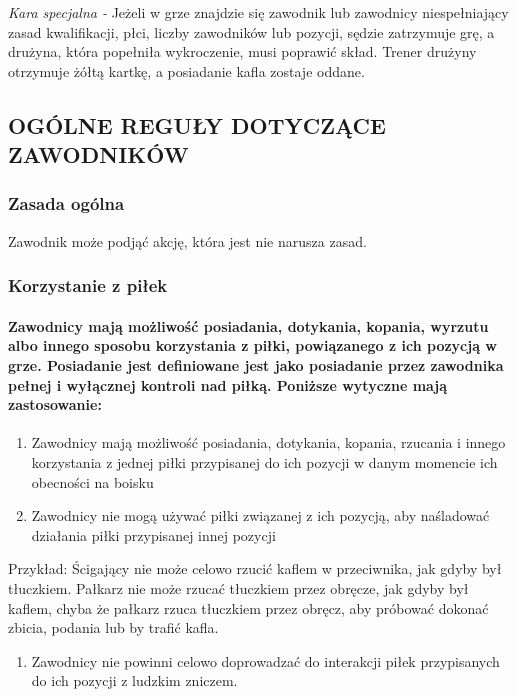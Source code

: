 \documentclass[12pt]{article}
\begin{document}
\emph{Kara specjalna -} Jeżeli w grze znajdzie się zawodnik lub
zawodnicy niespełniający zasad kwalifikacji, płci, liczby zawodników lub
pozycji, sędzie zatrzymuje grę, a drużyna, która popełniła wykroczenie,
musi poprawić skład. Trener drużyny otrzymuje żółtą kartkę, a posiadanie
kafla zostaje oddane.

\subsection{OGÓLNE REGUŁY DOTYCZĄCE ZAWODNIKÓW}

\subsubsection{Zasada ogólna}

Zawodnik może podjąć akcję, która jest nie narusza zasad.

\subsubsection{Korzystanie z piłek}

\paragraph{Zawodnicy mają możliwość posiadania, dotykania,
kopania, wyrzutu albo innego sposobu korzystania z piłki, powiązanego z
ich pozycją w grze. Posiadanie jest definiowane jest jako posiadanie
przez zawodnika pełnej i wyłącznej kontroli nad piłką. Poniższe wytyczne
mają zastosowanie:}

\begin{enumerate}
\item
    Zawodnicy mają możliwość posiadania, dotykania, kopania, rzucania i
  innego korzystania z jednej piłki przypisanej do ich pozycji w danym
  momencie ich obecności na boisku
  \item
    Zawodnicy nie mogą używać piłki związanej z ich pozycją, aby
  naśladować działania piłki przypisanej innej pozycji
  \end{enumerate}

Przykład: Ścigający nie może celowo rzucić kaflem w
przeciwnika, jak gdyby był tłuczkiem. Pałkarz nie może rzucać tłuczkiem
przez obręcze, jak gdyby był kaflem, chyba że pałkarz rzuca tłuczkiem
przez obręcz, aby próbować dokonać zbicia, podania lub by trafić kafla.

\begin{enumerate}[resume]
\item Zawodnicy nie powinni celowo doprowadzać do interakcji piłek
  przypisanych do ich pozycji z ludzkim zniczem.
  \end{enumerate}
\end{document}
